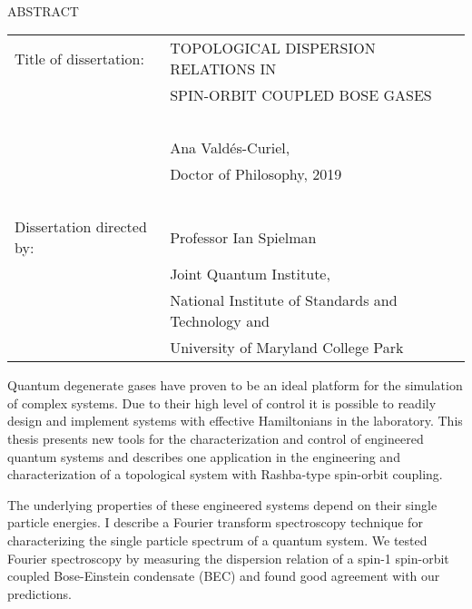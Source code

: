 
\hbox{\ }

\renewcommand{\baselinestretch}{1}
\small \normalsize

\begin{center}
\large{{ABSTRACT}} 

\vspace{3em} 

\end{center}
\hspace{-.15in}
\begin{tabular}{ll}
Title of dissertation:   
&				      {\large  TOPOLOGICAL DISPERSION RELATIONS IN } \\
&				      {\large  SPIN-ORBIT COUPLED BOSE GASES} \\
\ \\
&                     {\large  Ana Valdés-Curiel,} \\
&					  {\large  Doctor of Philosophy, 2019} \\
\ \\
Dissertation directed by: & {\large  Professor Ian Spielman} \\
&  							{\small	 Joint Quantum Institute,} \\
&  							{\small	 National Institute of Standards and Technology and} \\
&  							{\small	 University of Maryland College Park} \\
\end{tabular}

\vspace{3em}

\renewcommand{\baselinestretch}{2}
\large \normalsize

Quantum degenerate gases have proven to be an ideal platform for the  simulation of complex systems. Due to their high level of control it is possible to readily design and implement systems with effective Hamiltonians in the laboratory. This thesis presents new tools for the characterization and control of engineered quantum systems and describes one application in the engineering and characterization of a topological system with Rashba-type spin-orbit coupling. 

The underlying properties of these engineered systems depend on their single particle energies. I describe a Fourier transform spectroscopy technique for characterizing the single particle spectrum of a quantum system. We tested Fourier spectroscopy by measuring the dispersion relation of a spin-1 spin-orbit coupled Bose-Einstein condensate (BEC) and found good agreement with our predictions. %

